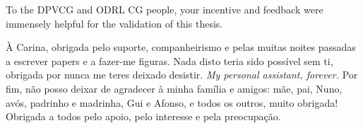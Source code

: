 To the DPVCG and ODRL CG people, your incentive and feedback were immensely helpful for the validation of this thesis.

À Carina, obrigada pelo suporte, companheirismo e pelas muitas noites passadas a escrever papers e a fazer-me figuras.
Nada disto teria sido possível sem ti, obrigada por nunca me teres deixado desistir.
\textit{My personal assistant, forever.}
Por fim, não posso deixar de agradecer à minha família e amigos: 
mãe, pai, Nuno, avós, padrinho e madrinha, Gui e Afonso, e todos os outros, muito obrigada!
Obrigada a todos pelo apoio, pelo interesse e pela preocupação.